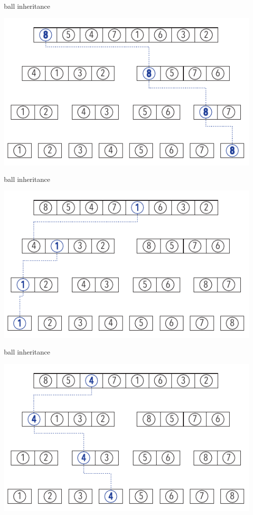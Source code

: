 \documentclass[pdf]{beamer}
\begin{document}
\begin{frame}{ball inheritance}
  \begin{center}
    \includegraphics[scale=1.0]{pictures/bolde_8.pdf}
  \end{center}
\end{frame}


\begin{frame}{ball inheritance}
  \begin{center}
    \includegraphics[scale=1.0]{pictures/bolde_1.pdf}
  \end{center}
\end{frame}

\begin{frame}{ball inheritance}
  \begin{center}
    \includegraphics[scale=1.0]{pictures/bolde_4.pdf}
  \end{center}
\end{frame}
\end{document}

